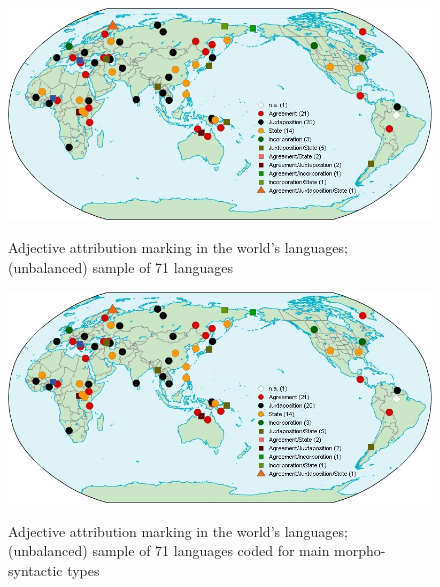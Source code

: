 
\newpage
\begin{figure}
    \begin{minipage}[b][8cm][c]{2\baselineskip}
        \caption[Adjective attribution marking, World]{Adjective attribution marking in the world's languages; (unbalanced) sample of 71 languages}
    \end{minipage}
\includegraphics[width=\textheight,angle=90]{figures/WorldMapTyp.jpg}%
\label{WorldMap}
\end{figure}

\newpage
\begin{figure}
    \begin{minipage}[b][8cm][c]{2\baselineskip}
        \caption[Adjective attribution marking, World, main types]{Adjective attribution marking in the world's languages; (unbalanced) sample of 71 languages coded for main morpho-syntactic types}
    \end{minipage}
\includegraphics[width=\textheight,angle=90]{figures/WorldMapTyp.jpg}%
\label{WorldMapTyp}
\end{figure}

